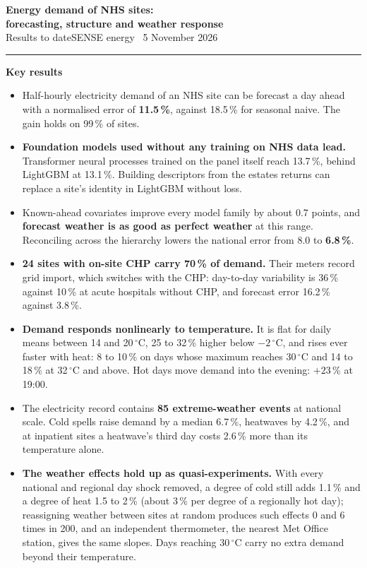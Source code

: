 \documentclass[10pt,a4paper]{article}
\begin{document}
{\LARGE\bfseries\color{accent} Energy demand of NHS sites:\\[2pt] forecasting, structure and weather response}\\[4pt]
{\large Results to date}\hfill{\color{muted}SENSE energy \textbullet\ 5 November 2026}
\vspace{2pt}\hrule\vspace{6pt}

\begin{tcolorbox}[colback=soft,colframe=soft,boxrule=0pt,arc=2pt,left=6pt,right=6pt,top=5pt,bottom=5pt]
\textbf{Key results}
\begin{itemize}
\item Half-hourly electricity demand of an NHS site can be forecast a day ahead with a normalised error of \textbf{11.5\,\%}, against 18.5\,\% for seasonal naive. The gain holds on 99\,\% of sites.
\item \textbf{Foundation models used without any training on NHS data lead.} Transformer neural processes trained on the panel itself reach 13.7\,\%, behind LightGBM at 13.1\,\%. Building descriptors from the estates returns can replace a site's identity in LightGBM without loss.
\item Known-ahead covariates improve every model family by about 0.7 points, and \textbf{forecast weather is as good as perfect weather} at this range. Reconciling across the hierarchy lowers the national error from 8.0 to \textbf{6.8\,\%}.
\item \textbf{24 sites with on-site CHP carry 70\,\% of demand.} Their meters record grid import, which switches with the CHP: day-to-day variability is 36\,\% against 10\,\% at acute hospitals without CHP, and forecast error 16.2\,\% against 3.8\,\%.
\item \textbf{Demand responds nonlinearly to temperature.} It is flat for daily means between 14 and 20\,$^\circ$C, 25 to 32\,\% higher below $-2$\,$^\circ$C, and rises ever faster with heat: 8 to 10\,\% on days whose maximum reaches 30\,$^\circ$C and 14 to 18\,\% at 32\,$^\circ$C and above. Hot days move demand into the evening: $+23$\,\% at 19:00.
\item The electricity record contains \textbf{85 extreme-weather events} at national scale. Cold spells raise demand by a median 6.7\,\%, heatwaves by 4.2\,\%, and at inpatient sites a heatwave's third day costs 2.6\,\% more than its temperature alone.
\item \textbf{The weather effects hold up as quasi-experiments.} With every national and regional day shock removed, a degree of cold still adds 1.1\,\% and a degree of heat 1.5 to 2\,\% (about 3\,\% per degree of a regionally hot day); reassigning weather between sites at random produces such effects 0 and 6 times in 200, and an independent thermometer, the nearest Met Office station, gives the same slopes. Days reaching 30\,$^\circ$C carry no extra demand beyond their temperature.

\end{itemize}
\end{tcolorbox}
\end{document}
